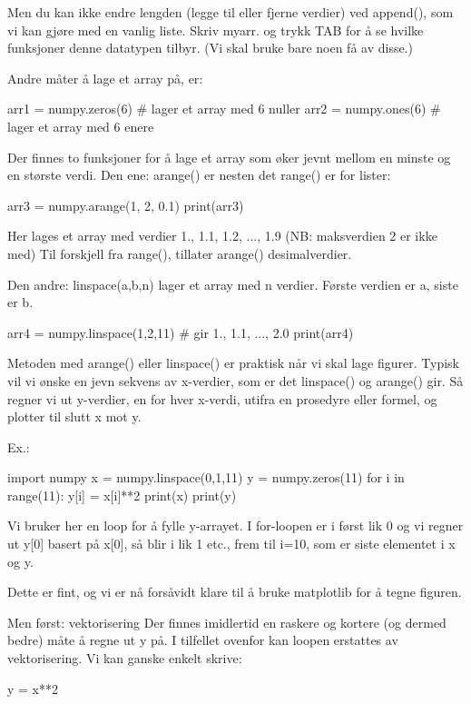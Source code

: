 Men du kan ikke endre lengden (legge til eller fjerne verdier) ved append(), som vi kan gjøre med en vanlig liste. Skriv myarr. og trykk TAB for å se hvilke funksjoner denne datatypen tilbyr. (Vi skal bruke bare noen få av disse.) 

Andre måter å lage et array på, er:
\begin{usncodebox}
arr1 = numpy.zeros(6)    # lager et array med 6 nuller
arr2 = numpy.ones(6)     # lager et array med 6 enere
\end{usncodebox}

Der finnes to funksjoner for å lage et array som øker jevnt mellom en minste og en største verdi. Den ene: arange() er nesten det range() er for lister: 
\begin{usncodebox}
arr3 = numpy.arange(1, 2, 0.1) 
print(arr3)
\end{usncodebox}

Her lages et array med verdier 1., 1.1, 1.2, ..., 1.9  (NB: maksverdien 2 er ikke med) Til forskjell fra range(), tillater arange() desimalverdier.

Den andre: linspace(a,b,n) lager et array med n verdier. Første verdien er a, siste er b. 
\begin{usncodebox}
arr4 = numpy.linspace(1,2,11)  # gir 1., 1.1, ..., 2.0  
print(arr4)
\end{usncodebox}

Metoden med arange() eller linspace() er praktisk når vi skal lage figurer. Typisk vil vi ønske en jevn sekvens av x-verdier, som er det linspace() og arange() gir. Så regner vi ut y-verdier, en for hver x-verdi, utifra en prosedyre eller formel, og plotter til slutt x mot y. 

Ex.:
\begin{usncodebox}
import numpy
x = numpy.linspace(0,1,11)
y = numpy.zeros(11)
for i in range(11): 
    y[i] = x[i]**2
print(x)
print(y)
\end{usncodebox}

Vi bruker her en loop for å fylle y-arrayet. I for-loopen er i først lik 0 og vi regner ut y[0] basert på x[0], så blir i lik 1 etc., frem til i=10, som er siste elementet i x og y. 

Dette er fint, og vi er nå forsåvidt klare til å bruke matplotlib for å tegne figuren.

Men først: vektorisering
Der finnes imidlertid en raskere og kortere (og dermed bedre) måte å regne ut y på. I tilfellet ovenfor kan loopen erstattes av vektorisering. Vi kan ganske enkelt skrive:
\begin{usncodebox}
y = x**2
\end{usncodebox}


